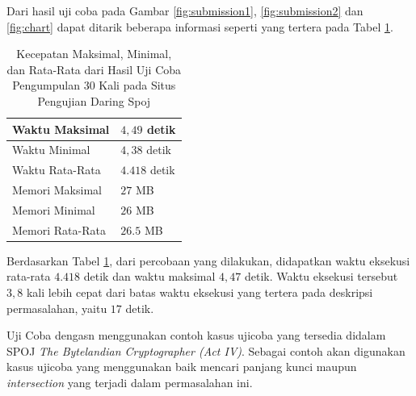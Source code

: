 Dari hasil uji coba pada Gambar \ref{fig:submission1}, \ref{fig:submission2} dan \ref{fig:chart}  dapat ditarik beberapa informasi seperti yang tertera pada Tabel \ref{tab:statistik}.

\begin{table}
	\centering
	\begin{tabular}{|l|l|} \hline
		Waktu Maksimal & $ 4,49 $ detik\\ \hline
		Waktu Minimal & $ 4,38 $ detik\\ \hline
		Waktu Rata-Rata & $ 4.418 $ detik\\ \hline
		Memori Maksimal & $ 27 $ MB\\ \hline
		Memori Minimal & $ 26 $ MB\\ \hline
		Memori Rata-Rata & $ 26.5 $ MB\\ \hline
	\end{tabular}
	\caption{Kecepatan Maksimal, Minimal, dan Rata-Rata dari Hasil Uji Coba Pengumpulan 30 Kali pada Situs Pengujian Daring Spoj}
	\label{tab:statistik}
\end{table}

\indent Berdasarkan Tabel \ref{tab:statistik}, dari percobaan yang dilakukan, didapatkan waktu eksekusi rata-rata $ 4.418 $ detik dan waktu maksimal $ 4,47 $ detik. Waktu eksekusi tersebut $3,8$ kali lebih cepat dari batas waktu eksekusi yang tertera pada deskripsi permasalahan, yaitu $ 17 $ detik.


\indent Uji Coba dengasn menggunakan contoh kasus ujicoba yang tersedia didalam SPOJ \textit{The Bytelandian Cryptographer (Act IV)}. Sebagai contoh akan digunakan kasus ujicoba yang menggunakan baik mencari panjang kunci maupun \textit{intersection} yang terjadi dalam permasalahan ini.


